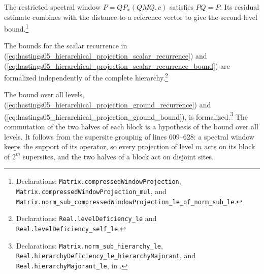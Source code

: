 \documentclass{article}
\providecommand{\leanid}[1]{\nolinkurl{#1}}
\begin{document}
The restricted spectral window $P=QP_x(QMQ,c)$ satisfies $PQ=P$.
Its residual estimate combines with the distance to a reference vector
to give the second-level bound.\footnote{Declarations:
    \leanid{Matrix.compressedWindowProjection},
    \leanid{Matrix.compressedWindowProjection_mul}, and
    \leanid{Matrix.norm_sub_compressedWindowProjection_le_of_norm_sub_le}.}

The bounds for the scalar recurrence in (\ref{eq:hastings05_hierarchical_projection_scalar_recurrence}) and
(\ref{eq:hastings05_hierarchical_projection_scalar_recurrence_bound}) are formalized independently of the complete
hierarchy.\footnote{Declarations:
    \leanid{Real.levelDeficiency_le} and
    \leanid{Real.levelDeficiency_self_le}.}

The bound over all levels,
(\ref{eq:hastings05_hierarchical_projection_ground_recurrence}) and
(\ref{eq:hastings05_hierarchical_projection_ground_bound}), is
formalized.\footnote{Declarations:
    \leanid{Matrix.norm_sub_hierarchy_le},
    \leanid{Real.hierarchyDeficiency_le_hierarchyMajorant}, and
    \leanid{Real.hierarchyMajorant_le}, in
    .}
The commutation of the two halves of each block is a hypothesis of the bound
over all levels. It follows from the supersite grouping of lines 609--628: a
spectral window keeps the support of its operator, so every projection of
level $m$ acts on its block of $2^m$ supersites, and the two halves of a block
act on disjoint sites.



\end{document}
